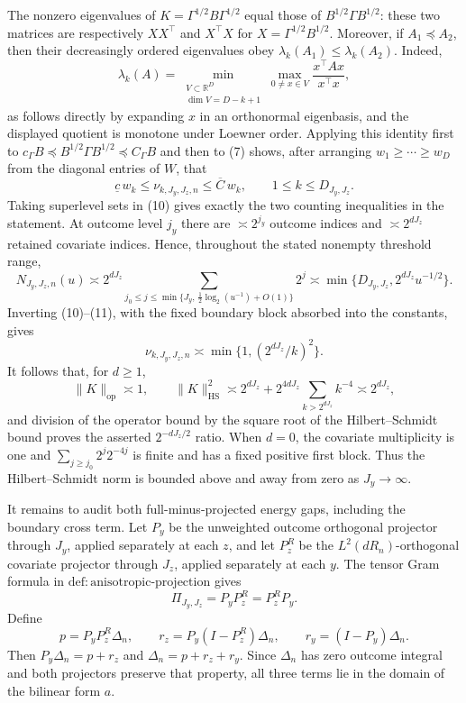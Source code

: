 The nonzero eigenvalues of \(K=\Gamma^{1/2}B\Gamma^{1/2}\) equal those of \(B^{1/2}\Gamma B^{1/2}\): these two matrices are respectively \(XX^{\top}\) and \(X^{\top}X\) for \(X=\Gamma^{1/2}B^{1/2}\).  Moreover, if \(A_1\preceq A_2\), then their decreasingly ordered eigenvalues obey \(\lambda_k(A_1)\leq\lambda_k(A_2)\).  Indeed,
\[
 \lambda_k(A)=\min_{\substack{V\subset\mathbb R^D\\\dim V=D-k+1}}
 \max_{0\neq x\in V}\frac{x^{\top}Ax}{x^{\top}x},
\]
as follows directly by expanding \(x\) in an orthonormal eigenbasis, and the displayed quotient is monotone under Loewner order.  Applying this identity first to \(c_\Gamma B\preceq B^{1/2}\Gamma B^{1/2}\preceq C_\Gamma B\) and then to (7) shows, after arranging \(w_1\geq\cdots\geq w_D\) from the diagonal entries of \(W\), that
\[
 \underline c\,w_k\leq\nu_{k,J_y,J_z,n}\leq\overline C\,w_k,
 \qquad 1\leq k\leq D_{J_y,J_z}. \tag{10}
\]
Taking superlevel sets in (10) gives exactly the two counting inequalities in the statement.  At outcome level \(j_y\) there are \(\asymp2^{j_y}\) outcome indices and \(\asymp2^{dJ_z}\) retained covariate indices.  Hence, throughout the stated nonempty threshold range,
\[
 N_{J_y,J_z,n}(u)
 \asymp 2^{dJ_z}
 \sum_{j_0\leq j\leq\min\{J_y,\,\frac12\log_2(u^{-1})+O(1)\}}2^j
 \asymp\min\{D_{J_y,J_z},2^{dJ_z}u^{-1/2}\}. \tag{11}
\]
Inverting (10)--(11), with the fixed boundary block absorbed into the constants, gives
\[
 \nu_{k,J_y,J_z,n}\asymp\min\{1,(2^{dJ_z}/k)^2\}. \tag{12}
\]
It follows that, for \(d\geq1\),
\[
 \|K\|_{\mathrm{op}}\asymp1,
 \qquad
 \|K\|_{\mathrm{HS}}^2
 \asymp 2^{dJ_z}+2^{4dJ_z}\sum_{k>2^{dJ_z}}k^{-4}
 \asymp2^{dJ_z}, \tag{13}
\]
and division of the operator bound by the square root of the Hilbert--Schmidt bound proves the asserted \(2^{-dJ_z/2}\) ratio.  When \(d=0\), the covariate multiplicity is one and \(\sum_{j\geq j_0}2^j2^{-4j}\) is finite and has a fixed positive first block.  Thus the Hilbert--Schmidt norm is bounded above and away from zero as \(J_y\to\infty\).

It remains to audit both full-minus-projected energy gaps, including the boundary cross term.  Let \(P_y\) be the unweighted outcome orthogonal projector through \(J_y\), applied separately at each \(z\), and let \(P_z^R\) be the \(L^2(dR_n)\)-orthogonal covariate projector through \(J_z\), applied separately at each \(y\).  The tensor Gram formula in \(\mathrm{def{:}anisotropic\text{-}projection}\) gives
\[
 \Pi_{J_y,J_z}=P_yP_z^R=P_z^RP_y. \tag{14}
\]
Define
\[
 p=P_yP_z^R\Delta_n,
 \qquad r_z=P_y(I-P_z^R)\Delta_n,
 \qquad r_y=(I-P_y)\Delta_n. \tag{15}
\]
Then \(P_y\Delta_n=p+r_z\) and \(\Delta_n=p+r_z+r_y\).  Since \(\Delta_n\) has zero outcome integral and both projectors preserve that property, all three terms lie in the domain of the bilinear form \(a\).

